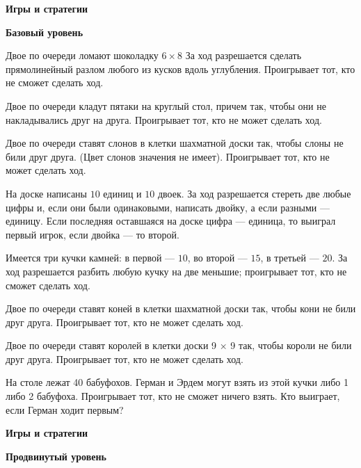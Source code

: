 \hspace{3mm}

\centerline{\bf \Huge Игры и стратегии}

\centerline{\bf \large Базовый уровень}

\begin{flushright}
        \scriptsize{}
\end{flushright}

Двое по очереди ломают шоколадку $6 \times 8$ За ход разрешается сделать
прямолинейный разлом любого из кусков вдоль углубления. Проигрывает тот, кто не сможет сделать ход.

Двое по очереди кладут пятаки на круглый стол, причем так, чтобы они не накладывались друг на друга. Проигрывает тот, кто не может сделать ход.

Двое по очереди ставят слонов в клетки шахматной доски так, чтобы слоны не били друг друга. (Цвет слонов значения не имеет). Проигрывает тот, кто не может сделать ход.

На доске написаны $10$ единиц и $10$ двоек. За ход разрешается стереть две любые цифры и, если они были одинаковыми, написать двойку, а если разными --- единицу. Если последняя оставшаяся на доске цифра --- единица, то выиграл первый игрок, если двойка --- то второй.


Имеется три кучки камней: в первой --- $10$, во второй --- $15$, в третьей --- $20$. За ход разрешается разбить любую кучку на две меньшие; проигрывает тот, кто не сможет сделать ход.


Двое по очереди ставят коней в клетки шахматной доски так, чтобы кони не били друг друга. Проигрывает тот, кто не может сделать ход.


Двое по очереди ставят королей в клетки доски 9 × 9 так, чтобы короли не били друг друга. Проигрывает тот, кто не может сделать ход.

На столе лежат 40 бабуфохов. Герман и Эрдем могут взять из этой кучки либо 1 либо 2 бабуфоха. Проигрывает тот, кто не сможет ничего взять. Кто выиграет, если Герман ходит первым?

\newpage

\hspace{3mm}

\centerline{\bf \Huge Игры и стратегии}

\centerline{\bf \large Продвинутый уровень}

\begin{flushright}
        \scriptsize{}
\end{flushright}

